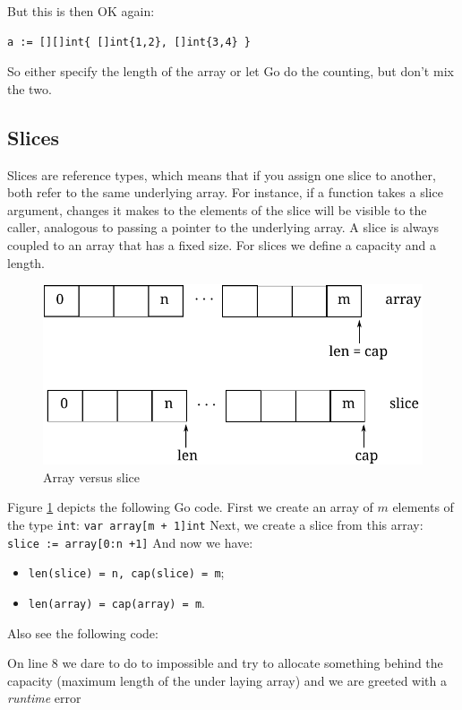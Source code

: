 But this is then OK again:
\begin{lstlisting}
a := [][]int{ []int{1,2}, []int{3,4} }
\end{lstlisting}
So either specify the length of the array or let Go do the counting, but
don't mix the two.
\subsection{Slices}
Slices are reference types, which means that if you assign one slice to
another, both refer to the same underlying array. For instance, if a
function takes a slice argument, changes it makes to the elements of the
slice will be visible to the caller, analogous to passing a pointer to
the underlying array. A slice is always coupled to an array that has
a fixed size. For slices we define a capacity and a length.

\begin{figure}[H]
\caption{Array versus slice}
\label{fig:array-vs-slice}
\begin{center}
\includegraphics[scale=0.65]{fig/array-vs-slice.pdf}
\end{center}
\end{figure}
Figure \ref{fig:array-vs-slice} depicts the following Go code.
First we create an array of $m$ elements of the type \lstinline{int}:
\lstinline{var array[m + 1]int}\newline
Next, we create a slice from this array:
\lstinline{slice := array[0:n +1]}\newline
And now we have:
\begin{itemize}
\item{\lstinline{len(slice) = n, cap(slice) = m};}
\item{\lstinline{len(array) = cap(array) = m}.}
\end{itemize}
Also see the following code:

On line 8 we dare to do to impossible and try to allocate something
behind the capacity (maximum length of the under laying array) and
we are greeted with a \emph{runtime} error

